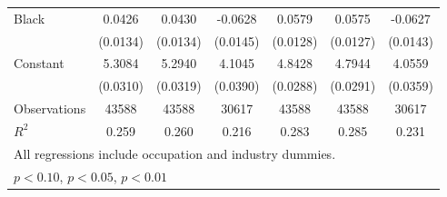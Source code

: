 {\begin{longtable}{l*{6}{c}}
Black               &      0.0426\sym{***}&      0.0430\sym{***}&     -0.0628\sym{***}&      0.0579\sym{***}&      0.0575\sym{***}&     -0.0627\sym{***}\\
                    &    (0.0134)         &    (0.0134)         &    (0.0145)         &    (0.0128)         &    (0.0127)         &    (0.0143)         \\
Constant            &      5.3084\sym{***}&      5.2940\sym{***}&      4.1045\sym{***}&      4.8428\sym{***}&      4.7944\sym{***}&      4.0559\sym{***}\\
                    &    (0.0310)         &    (0.0319)         &    (0.0390)         &    (0.0288)         &    (0.0291)         &    (0.0359)         \\
\hline  
Observations        &       43588         &       43588         &       30617         &       43588         &       43588         &       30617         \\
\(R^{2}\)           &       0.259         &       0.260         &       0.216         &       0.283         &       0.285         &       0.231         \\
\hline  
\multicolumn{7}{l}{\footnotesize All regressions include occupation and industry dummies.}\\
\multicolumn{7}{l}{\footnotesize \sym{*} \(p<0.10\), \sym{**} \(p<0.05\), \sym{***} \(p<0.01\)}\\
\end{longtable}
}
